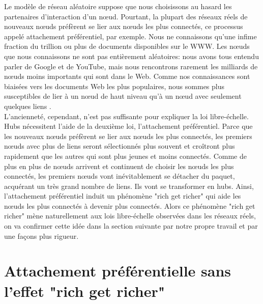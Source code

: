 Le modèle de réseau aléatoire suppose que nous choisissons au hasard les partenaires d'interaction d'un nœud. Pourtant, la plupart des réseaux réels de nouveaux nœuds préfèrent se lier aux nœuds les plus connectés, ce processus appelé attachement préférentiel, par exemple. Nous ne connaissons qu'une infime fraction du trillion ou plus de documents disponibles sur le WWW. Les nœuds que nous connaissons ne sont pas entièrement aléatoires: nous avons tous entendu parler de Google et de YouTube, mais nous rencontrons rarement les milliards de nœuds moins importants qui sont dans le Web. Comme nos connaissances sont biaisées vers les documents Web les plus populaires, nous sommes plus susceptibles de lier à un nœud de haut niveau qu'à un nœud avec seulement quelques liens \cite{Barabasi2002}.\\
L'ancienneté, cependant, n'est pas suffisante pour expliquer la loi libre-échelle. Hubs nécessitent l'aide de la deuxième loi, l'attachement préférentiel. Parce que les nouveaux nœuds préfèrent se lier aux nœuds les plus connectés, les premiers nœuds avec plus de liens seront sélectionnés plus souvent et croîtront plus rapidement que les autres qui sont plus jeunes et moins connectés. Comme de plus en plus de nœuds arrivent et continuent de choisir les nœuds les plus connectés, les premiers nœuds vont inévitablement se détacher du paquet, acquérant un très grand nombre de liens. Ils vont se transformer en hubs. Ainsi, l'attachement préférentiel induit un phénomène "rich get richer" qui aide les nœuds les plus connectés à devenir plus connectés. Alors ce phénomène "rich get richer" mène naturellement aux lois libre-échelle observées dans les réseaux réels, on va confirmer cette idée dans la section suivante par notre propre travail et par une façons plus rigueur.
\begin{sloppypar}
\section{Attachement préférentielle sans l'effet "rich get richer"}
\end{sloppypar}
